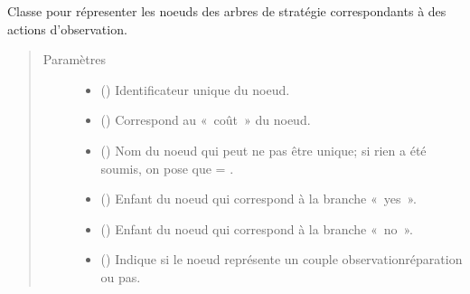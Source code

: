 \documentclass[letterpaper,10pt,french]{sphinxmanual}
\begin{document}
\begin{fulllineitems}
\label{\detokenize{index:StrategyTree.Observation}}
Classe pour répresenter les noeuds des arbres de stratégie correspondants à
des actions d’observation.
\begin{quote}\begin{description}
\item[{Paramètres}] \leavevmode\begin{itemize}
\item {} 
 () \textendash{} Identificateur unique du noeud.

\item {} 
 () \textendash{} Correspond au « coût » du noeud.

\item {} 
 (\sphinxstyleliteralemphasis{\sphinxupquote{, }}) \textendash{} Nom du noeud qui peut ne pas être unique; si rien a été soumis, on pose
que  = .

\item {} 
 ({\hyperref[\detokenize{index:StrategyTree.NodeST}]{}}\sphinxstyleliteralemphasis{\sphinxupquote{, }}) \textendash{} Enfant du noeud qui correspond à la branche « yes ».

\item {} 
 ({\hyperref[\detokenize{index:StrategyTree.NodeST}]{}}\sphinxstyleliteralemphasis{\sphinxupquote{, }}) \textendash{} Enfant du noeud qui correspond à la branche « no ».

\item {} 
 (\sphinxstyleliteralemphasis{\sphinxupquote{, }}) \textendash{} Indique si le noeud représente un couple observation\sphinxhyphen{}réparation ou pas.


\end{itemize}
\end{description}
\end{quote}
\end{fulllineitems}
\end{document}
